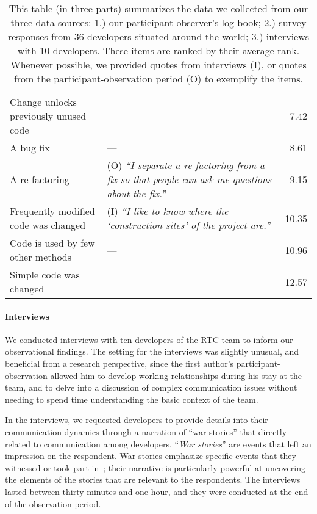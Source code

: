 \begin{table*}[th!]
{\begin{tabular}{l@{\hspace{0pt}}l@{\hspace{-19pt}}r}
Change unlocks previously unused code &--- & 7.42\\%
A bug fix &--- & 8.61\\%
A re-factoring &(O) {\footnotesize\emph{``I separate a re-factoring from a fix so that people can ask me questions about the fix.''}}& 9.15\\%
Frequently modified code was changed &(I) \emph{``I like to know where the `construction sites' of the project are.''}& 10.35\\%
Code is used by few other methods &--- & 10.96\\%
Simple code was changed\phantom{abcdefgheabcdefghe} &--- & 12.57\\%
\bottomrule
\end{tabular}
\label{tab:sub-technical}
}
\caption{This table (in three parts) summarizes the data we collected from our three data sources: 1.) our participant-observer's log-book; 2.) survey responses from 36 developers situated around the world; 3.) interviews with 10 developers.  These items are ranked by their average rank.  Whenever possible, we provided quotes from interviews (I), or quotes from the participant-observation period (O) to exemplify the items.}
\label{tab:surveyfactors}
\end{table*}

\paragraph{Interviews}
We conducted interviews with ten developers of the RTC team to inform our observational findings. The setting for the interviews was slightly unusual, and beneficial from a research perspective, since the first author's participant-observation allowed him to develop working relationships during his stay at the team, and to delve into a discussion of complex communication issues without needing to spend time understanding the basic context of the team.

In the interviews, we requested developers to provide details into their communication dynamics through a narration of ``war stories'' that directly related to communication among developers. ``\emph{War stories}'' are events that left an impression on the respondent. War stories emphasize specific events that they witnessed or took part in~\cite{lutters:ist:2007}; their narrative is particularly powerful at uncovering the elements of the stories that are relevant to the respondents. The interviews lasted between thirty minutes and one hour, and they were conducted at the end of the observation period. 


